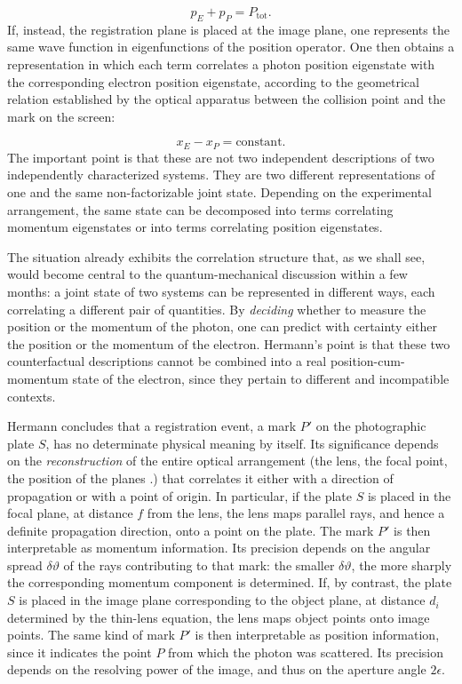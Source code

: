 \documentclass[final,12pt]{article}
\begin{document}
\begin{itemize}
\begin{equation*}
p_E+p_P=P_{\mathrm{tot}}.
\end{equation*}
%
If, instead, the registration plane is placed at the image plane, one represents the same wave function in eigenfunctions of the position operator. One then obtains a representation in which each term correlates a photon position eigenstate with the corresponding electron position eigenstate, according to the geometrical relation established by the optical apparatus between the collision point and the mark on the screen:

\begin{equation*}
x_E-x_P=\text{constant}.
\end{equation*}
%
The important point is that these are not two independent descriptions of two independently characterized systems. They are two different representations of one and the same non-factorizable joint state. Depending on the experimental arrangement, the same state can be decomposed into terms correlating momentum eigenstates or into terms correlating position eigenstates.
\end{itemize}%
%
The situation already exhibits the correlation structure that, as we shall see, would become central to the quantum-mechanical discussion within a few months: a joint state of two systems can be represented in different ways, each correlating a different pair of quantities. By \emph{deciding} whether to measure the position or the momentum of the photon, one can predict with certainty either the position or the momentum of the electron. Hermann's point is that these two counterfactual descriptions cannot be combined into a real position-cum-momentum state of the electron, since they pertain to different and incompatible contexts.

Hermann concludes that a registration event, a mark $P'$ on the photographic plate $S$, has no determinate physical meaning by itself. Its significance depends on the \emph{reconstruction} of the entire optical arrangement (the lens, the focal point, the position of the planes \etc.) that correlates it either with a direction of propagation or with a point of origin. In particular, if the plate $S$ is placed in the focal plane, at distance $f$ from the lens, the lens maps parallel rays, and hence a definite propagation direction, onto a point on the plate. The mark $P'$ is then interpretable as momentum information. Its precision depends on the angular spread $\delta\vartheta$ of the rays contributing to that mark: the smaller $\delta\vartheta$, the more sharply the corresponding momentum component is determined. If, by contrast, the plate $S$ is placed in the image plane corresponding to the object plane, at distance $d_i$ determined by the thin-lens equation, the lens maps object points onto image points. The same kind of mark $P'$ is then interpretable as position information, since it indicates the point $P$ from which the photon was scattered. Its precision depends on the resolving power of the image, and thus on the aperture angle $2\epsilon$. 
\end{document}
